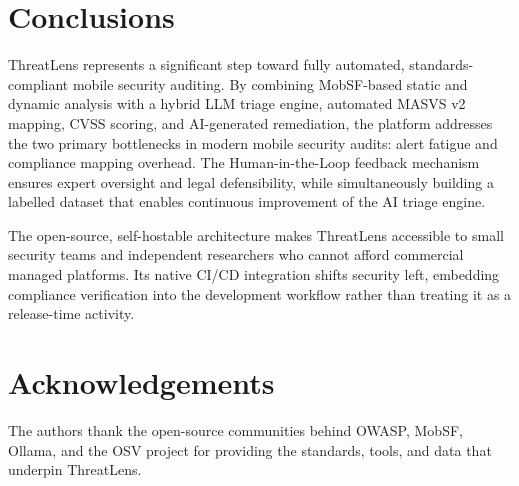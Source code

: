 \documentclass[preprint,12pt,a4paper]{elsarticle}
\begin{document}
\section{Conclusions}

ThreatLens represents a significant step toward fully automated, standards-compliant
mobile security auditing. By combining MobSF-based static and dynamic analysis with
a hybrid LLM triage engine, automated MASVS v2 mapping, CVSS scoring, and
AI-generated remediation, the platform addresses the two primary bottlenecks in modern
mobile security audits: alert fatigue and compliance mapping overhead. The Human-in-the-Loop
feedback mechanism ensures expert oversight and legal defensibility, while simultaneously
building a labelled dataset that enables continuous improvement of the AI triage engine.

The open-source, self-hostable architecture makes ThreatLens accessible to small security
teams and independent researchers who cannot afford commercial managed platforms. Its
native CI/CD integration shifts security left, embedding compliance verification into the
development workflow rather than treating it as a release-time activity.

\section*{Acknowledgements}

The authors thank the open-source communities behind OWASP, MobSF, Ollama, and the
OSV project for providing the standards, tools, and data that underpin ThreatLens.
\end{document}

